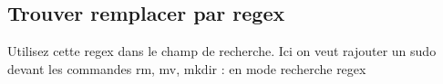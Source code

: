 \subsection*{Trouver remplacer par regex}

Utilisez cette regex dans le champ de recherche. Ici on veut rajouter un sudo devant les commandes rm, mv, mkdir \+: en mode recherche regex


 